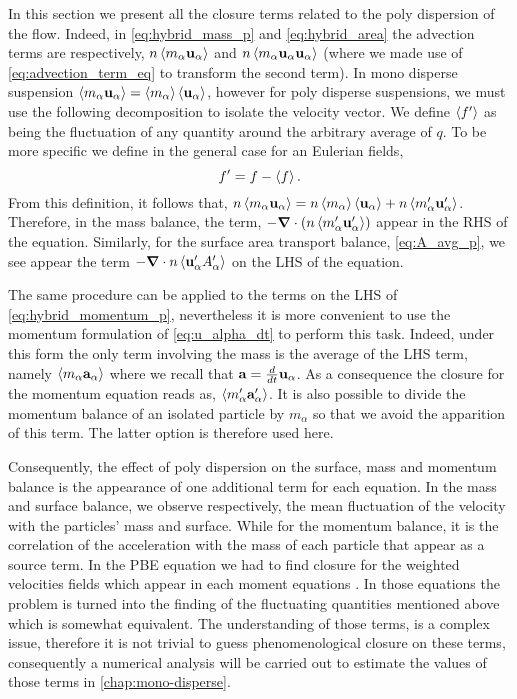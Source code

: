 In this section we present all the closure terms related to the poly dispersion of the flow. 
Indeed, in \ref{eq:hybrid_mass_p} and \ref{eq:hybrid_area} the advection terms are respectively, $n \left<m_\alpha \textbf{u}_\alpha\right>$ and $n \left<m_\alpha \textbf{u}_\alpha\textbf{u}_\alpha\right>$  (where we made use of \ref{eq:advection_term_eq} to transform the second term).  
In mono disperse suspension $\left<m_\alpha \textbf{u}_\alpha\right> = \left<m_\alpha\right>\left<\textbf{u}_\alpha\right>$, however for poly disperse suspensions, we must use the following decomposition to isolate the velocity vector.
We define $\left<f'\right>$ as being the fluctuation of any quantity around the arbitrary average of $q$.
To be more specific we define in the general case for an Eulerian fields, 
\begin{equation*}
    f' = f - \left<f\right>. 
\end{equation*}
From this definition, it follows that, $n \left<m_\alpha \textbf{u}_\alpha\right> = n \left<m_\alpha\right>\left<\textbf{u}_\alpha\right> + n \left<m_\alpha' \textbf{u}_\alpha'\right>$.
Therefore, in the mass balance, the term, $-\bm{\nabla}\cdot(n \left<m_\alpha' \textbf{u}_\alpha'\right>)$ appear in the RHS of the equation. 
Similarly, for the surface area transport balance, \ref{eq:A_avg_p}, we see appear the term $-\bm{\nabla} \cdot n \left<\textbf{u}_\alpha' A_\alpha'\right>$ on the LHS of the equation. 

The same procedure can be applied to the terms on the LHS of \ref{eq:hybrid_momentum_p}, nevertheless it is more convenient to use the momentum formulation of \ref{eq:u_alpha_dt} to perform this task. 
Indeed, under this form the only term involving the mass is the average of the LHS term, namely $\left<m_\alpha \textbf{a}_\alpha\right>$ where we recall that $\textbf{a} = \frac{d}{d t} \textbf{u}_\alpha$. 
As a consequence the closure for the momentum equation reads as, $\left<m_\alpha' \textbf{a}_\alpha'\right>$.
It is also possible to divide the momentum balance of an isolated particle by $m_\alpha$ so that we avoid the apparition of this term.
The latter option is therefore used here.

Consequently, the effect of poly dispersion on the surface, mass and momentum balance is the appearance of one additional term for each equation.
In the mass and surface balance, we observe respectively, the mean fluctuation of the velocity with the particles' mass and surface. 
While for the momentum balance, it is the correlation of the acceleration with the mass of each particle that appear as a source term. 
In the PBE equation we had to find closure for the weighted velocities fields which appear in each moment equations \citet{zaepffel2011modelisation}.
In those equations the problem is turned into the finding of the fluctuating quantities mentioned above which is somewhat equivalent.  
The understanding of those terms, is a complex issue, therefore it is not trivial to guess phenomenological closure on these terms, consequently a numerical analysis will be carried out to estimate the values of those terms in \ref{chap:mono-disperse}.


